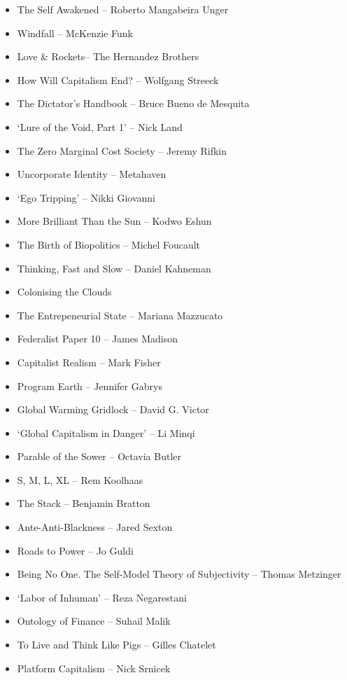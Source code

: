 \documentclass[
]{article}
\providecommand{\tightlist}{%
  \setlength{\itemsep}{0pt}\setlength{\parskip}{0pt}}
\begin{document}
\begin{itemize}
\tightlist
\item
  The Self Awakened -- Roberto Mangabeira Unger
\item
  Windfall -- McKenzie Funk
\item
  Love \& Rockets-- The Hernandez Brothers
\item
  How Will Capitalism End? -- Wolfgang Streeck
\item
  The Dictator's Handbook -- Bruce Bueno de Mesquita
\item
  `Lure of the Void, Part 1' -- Nick Land
\item
  The Zero Marginal Cost Society -- Jeremy Rifkin
\item
  Uncorporate Identity -- Metahaven
\item
  `Ego Tripping' -- Nikki Giovanni
\item
  More Brilliant Than the Sun -- Kodwo Eshun
\item
  The Birth of Biopolitics -- Michel Foucault
\item
  Thinking, Fast and Slow -- Daniel Kahneman
\item
  Colonising the Clouds
\item
  The Entrepeneurial State -- Mariana Mazzucato
\item
  Federalist Paper 10 -- James Madison
\item
  Capitalist Realism -- Mark Fisher
\item
  Program Earth -- Jennifer Gabrys
\item
  Global Warming Gridlock -- David G. Victor
\item
  `Global Capitalism in Danger' -- Li Minqi
\item
  Parable of the Sower -- Octavia Butler
\item
  S, M, L, XL -- Rem Koolhaas
\item
  The Stack -- Benjamin Bratton
\item
  Ante-Anti-Blackness -- Jared Sexton
\item
  Roads to Power -- Jo Guldi
\item
  Being No One. The Self-Model Theory of Subjectivity -- Thomas
  Metzinger
\item
  `Labor of Inhuman' -- Reza Negarestani
\item
  Ontology of Finance -- Suhail Malik
\item
  To Live and Think Like Pigs -- Gilles Chatelet
\item
  Platform Capitalism -- Nick Srnicek

\end{itemize}
\end{document}
